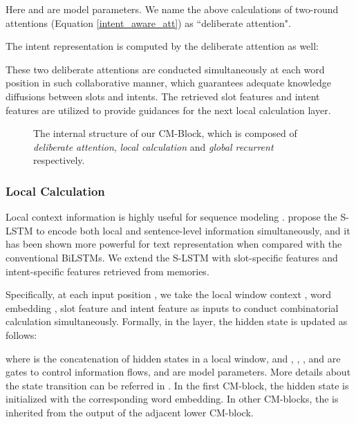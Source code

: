 \documentclass[11pt,a4paper]{article}
\begin{document}
Here  and  are model parameters. We name the above calculations of two-round attentions (Equation \ref{intent_aware_att}) as ``deliberate attention".

The intent representation  is computed by the deliberate attention as well:


These two deliberate attentions are conducted simultaneously at each word position in such collaborative manner, which guarantees adequate knowledge diffusions between slots and intents. The retrieved slot features  and intent features  are utilized to provide guidances for the next local calculation layer. 

\begin{figure}[t!]
\begin{center}
      \vspace{-5pt}
      \caption{
      The internal structure of our CM-Block,
      which is composed of \emph{deliberate attention}, \emph{local calculation} and  \emph{global recurrent} respectively.
      } 
      \label{recurrent_details}  
 \end{center}
\end{figure}

\subsubsection*{Local Calculation}
Local context information is highly useful for sequence modeling \cite{local_window_2016,local_window2_2016}. 
\citeauthor{SLSTM_2018}  propose the S-LSTM to encode both local and sentence-level information simultaneously, and it has been shown more powerful for text representation when compared with the conventional BiLSTMs.
We extend the S-LSTM with slot-specific features  and intent-specific features  retrieved from memories.


Specifically, at each input position , we take the local window context , word embedding , slot feature   and intent feature  as inputs to conduct combinatorial calculation simultaneously.
Formally, in the  layer, the hidden state  is updated as follows:

where  is the concatenation of hidden states in a local window, and , , ,  and  are gates to control information flows, and   are model parameters. More details about the state transition can be referred in \cite{SLSTM_2018}. In the first CM-block, the hidden state  is initialized with the corresponding word embedding. In other CM-blocks, the  is inherited from the output of the adjacent lower CM-block.
\end{document}
